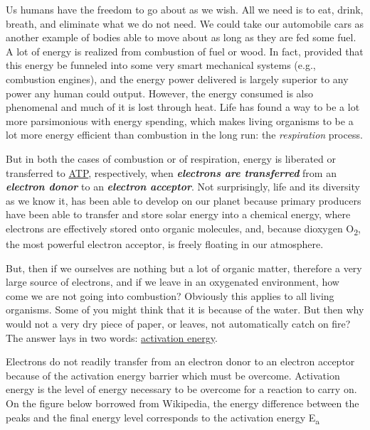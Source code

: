 \documentclass[]{book}
\theoremstyle{definition}
\theoremstyle{definition}
\theoremstyle{definition}
\theoremstyle{remark}
\begin{document}
Us humans have the freedom to go about as we wish. All we need is to
eat, drink, breath, and eliminate what we do not need. We could take our
automobile cars as another example of bodies able to move about as long
as they are fed some fuel. A lot of energy is realized from combustion
of fuel or wood. In fact, provided that this energy be funneled into
some very smart mechanical systems (e.g., combustion engines), and the
energy power delivered is largely superior to any power any human could
output. However, the energy consumed is also phenomenal and much of it
is lost through heat. Life has found a way to be a lot more parsimonious
with energy spending, which makes living organisms to be a lot more
energy efficient than combustion in the long run: the \emph{respiration}
process.

But in both the cases of combustion or of respiration, energy is
liberated or transferred to \protect\hyperlink{ATP}{ATP}, respectively,
when \emph{\textbf{electrons are transferred}} from an
\emph{\textbf{electron donor}} to an \emph{\textbf{electron acceptor}}.
Not surprisingly, life and its diversity as we know it, has been able to
develop on our planet because primary producers have been able to
transfer and store solar energy into a chemical energy, where electrons
are effectively stored onto organic molecules, and, because dioxygen
O\textsubscript{2}, the most powerful electron acceptor, is freely
floating in our atmosphere.

But, then if we ourselves are nothing but a lot of organic matter,
therefore a very large source of electrons, and if we leave in an
oxygenated environment, how come we are not going into combustion?
Obviously this applies to all living organisms. Some of you might think
that it is because of the water. But then why would not a very dry piece
of paper, or leaves, not automatically catch on fire? The answer lays in
two words:
\href{https://en.wikipedia.org/wiki/Activation_energy}{activation
energy}.

Electrons do not readily transfer from an electron donor to an electron
acceptor because of the activation energy barrier which must be
overcome. Activation energy is the level of energy necessary to be
overcome for a reaction to carry on. On the figure below borrowed from
Wikipedia, the energy difference between the peaks and the final energy
level corresponds to the activation energy E\textsubscript{a}
\end{document}
